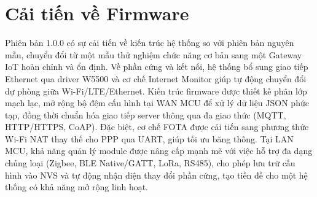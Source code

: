 \section{Cải tiến về Firmware}
    Phiên bản 1.0.0 có sự cải tiến về kiến trúc hệ thống so với phiên bản nguyên mẫu, chuyển đổi từ một mẫu thử nghiệm chức năng cơ bản sang một Gateway IoT hoàn chỉnh và ổn định. Về phần cứng và kết nối, hệ thống bổ sung giao tiếp Ethernet qua driver W5500 và cơ chế Internet Monitor giúp tự động chuyển đổi dự phòng giữa Wi-Fi/LTE/Ethernet. Kiến trúc firmware được thiết kế phân lớp mạch lạc, mở rộng bộ đệm cấu hình tại WAN MCU để xử lý dữ liệu JSON phức tạp, đồng thời chuẩn hóa giao tiếp server thông qua đa giao thức (MQTT, HTTP/HTTPS, CoAP). Đặc biệt, cơ chế FOTA được cải tiến sang phương thức Wi-Fi NAT thay thế cho PPP qua UART, giúp tối ưu băng thông. Tại LAN MCU, khả năng quản lý module được nâng cấp mạnh mẽ với việc hỗ trợ đa dạng chủng loại (Zigbee, BLE Native/GATT, LoRa, RS485), cho phép lưu trữ cấu hình vào NVS và tự động nhận diện thay đổi phần cứng, tạo tiền đề cho một hệ thống có khả năng mở rộng linh hoạt.

